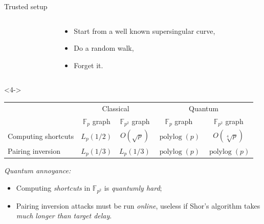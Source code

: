 \documentclass[aspectratio=169]{beamer}
\newcommand{\F}{\mathbb{F}}
\DeclareMathOperator{\polylog}{polylog}
\begin{document}
\begin{frame}{Trusted setup}
  \begin{columns}
    \begin{column}{0.5\textwidth}
      \centering
    \end{column}
    \begin{column}{0.5\textwidth}
      \begin{itemize}
      \item<1-> Start from a well known supersingular curve,
      \item<2-> Do a random walk,
      \item<3-> Forget it.
      \end{itemize}
    \end{column}
  \end{columns}

  \begin{uncoverenv}<4->
    \begin{center}
      \begin{tabular}{p{10em} | c c | c c}
        & \multicolumn{2}{c|}{Classical} & \multicolumn{2}{c}{Quantum} \\
        & $\F_p$ graph & $\F_{p^2}$ graph & $\F_p$ graph & $\F_{p^2}$ graph \\
        \hline
        Computing shortcuts & $L_p(1/2)$ & $O(\sqrt{p})$ & $\polylog(p)$ & $O(\sqrt[4]{p})$\\
        Pairing inversion & $L_p(1/3)$ & $L_p(1/3)$ & $\polylog(p)$ & $\polylog(p)$\\
      \end{tabular}
    \end{center}
  
    \emph{\it Quantum annoyance:}
    \begin{itemize}
    \item Computing \emph{shortcuts} in $\F_{p^2}$ is \emph{quantumly
        hard};
    \item Pairing inversion attacks must be run \emph{online}, useless
      if Shor's algorithm takes \emph{much longer than target delay}.
    \end{itemize}
  \end{uncoverenv}
\end{frame}
\end{document}
